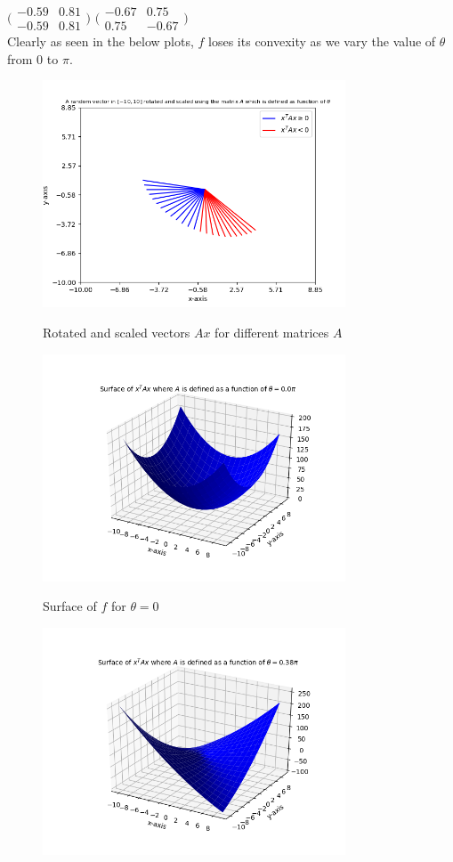 \documentclass{article}
\begin{document}
\begin{flushleft}
$\Big(\begin{matrix}-0.59 & 0.81 \\ -0.59 & 0.81\end{matrix}\Big)$
$\Big(\begin{matrix}-0.67 & 0.75 \\ 0.75 & -0.67\end{matrix}\Big)$\\
Clearly as seen in the below plots, $f$ loses its convexity as we vary the value of $\theta$ from $0$ to $\pi$.\\
\begin{figure}[htp]
        \centering
        \includegraphics[width=9cm]{psd.png}\\
        \caption{Rotated and scaled vectors $Ax$ for different matrices $A$}
\end{figure}
\begin{figure}[htp]
        \centering
        \includegraphics[width=9cm]{0pi.png}\\
        \caption{Surface of $f$ for $\theta=0$}
\end{figure}
\begin{figure}[htp]
        \centering
        \includegraphics[width=9cm]{38pi.png}\\

\end{figure}
\end{flushleft}
\end{document}
